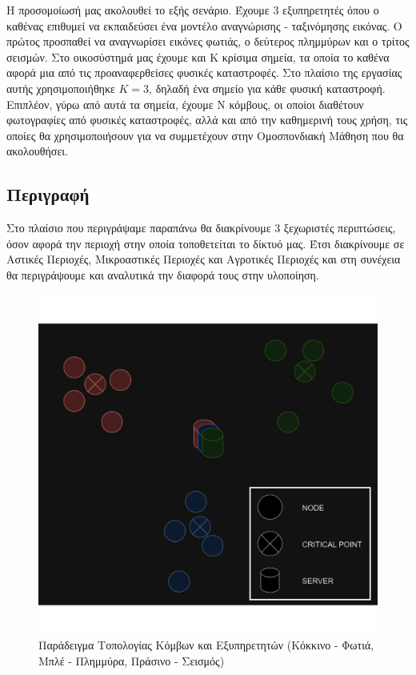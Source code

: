 Η προσομοίωσή μας ακολουθεί το εξής σενάριο. Έχουμε 3 εξυπηρετητές όπου ο καθένας επιθυμεί να εκπαιδεύσει ένα μοντέλο αναγνώρισης - ταξινόμησης εικόνας. Ο πρώτος προσπαθεί να αναγνωρίσει εικόνες φωτιάς, ο δεύτερος πλημμύρων και ο τρίτος σεισμών. Στο οικοσύστημά μας έχουμε και Κ κρίσιμα σημεία, τα οποία το καθένα αφορά μια από τις προαναφερθείσες φυσικές καταστροφές. Στο πλαίσιο της εργασίας αυτής χρησιμοποιήθηκε $K=3$, δηλαδή ένα σημείο για κάθε φυσική καταστροφή. Επιπλέον, γύρω από αυτά τα σημεία, έχουμε Ν κόμβους, οι οποίοι διαθέτουν φωτογραφίες από φυσικές καταστροφές, αλλά και από την καθημερινή τους χρήση, τις οποίες θα χρησιμοποιήσουν για να συμμετέχουν στην Ομοσπονδιακή Μάθηση που θα ακολουθήσει.

\subsection{Περιγραφή}

Στο πλαίσιο που περιγράψαμε παραπάνω θα διακρίνουμε 3 ξεχωριστές περιπτώσεις, όσον αφορά την περιοχή στην οποία τοποθετείται το δίκτυό μας. Έτσι διακρίνουμε σε Αστικές Περιοχές, Μικροαστικές Περιοχές και Αγροτικές Περιοχές και στη συνέχεια θα περιγράψουμε και αναλυτικά την διαφορά τους στην υλοποίηση. 

\begin{figure}[ht]
    \centering
    \includegraphics[width=\textwidth]{figures/chapter1/topology+ypomn.png}
    \vspace{-1cm}
    \caption{Παράδειγμα Τοπολογίας Κόμβων και Εξυπηρετητών (Κόκκινο - Φωτιά, Μπλέ - Πλημμύρα, Πράσινο - Σεισμός)}
    \label{fig46}
\end{figure}

